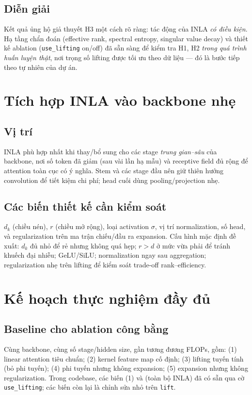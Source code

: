 \documentclass[12pt,a4paper]{article}
\begin{document}
\subsection{Diễn giải}
Kết quả ủng hộ giả thuyết H3 một cách rõ ràng: tác động của INLA \emph{có điều kiện}. Hạ tầng chẩn
đoán (effective rank, spectral entropy, singular value decay) và thiết kế ablation
(\texttt{use\_lifting} on/off) đã sẵn sàng để kiểm tra H1, H2 \emph{trong quá trình huấn luyện thật},
nơi trọng số lifting được tối ưu theo dữ liệu --- đó là bước tiếp theo tự nhiên của dự án.

\section{Tích hợp INLA vào backbone nhẹ}

\subsection{Vị trí}
INLA phù hợp nhất khi thay/bổ sung cho các stage \emph{trung gian--sâu} của backbone, nơi số token
đã giảm (sau vài lần hạ mẫu) và receptive field đủ rộng để attention toàn cục có ý nghĩa. Stem và các
stage đầu nên giữ thiên hướng convolution để tiết kiệm chi phí; head cuối dùng pooling/projection
nhẹ.

\subsection{Các biến thiết kế cần kiểm soát}
$d_k$ (chiều nén), $r$ (chiều mở rộng), loại activation $\sigma$, vị trí normalization, số head, và
regularization trên ma trận chiếu/đầu ra expansion. Cấu hình mặc định đề xuất: $d_k$ đủ nhỏ để rẻ
nhưng không quá hẹp; $r > d$ ở mức vừa phải để tránh khuếch đại nhiễu; GeLU/SiLU; normalization ngay
sau aggregation; regularization nhẹ trên lifting để kiểm soát trade-off rank--efficiency.

\section{Kế hoạch thực nghiệm đầy đủ}

\subsection{Baseline cho ablation công bằng}
Cùng backbone, cùng số stage/hidden size, gần tương đương FLOPs, gồm: (1) linear attention tiêu
chuẩn; (2) kernel feature map cố định; (3) lifting tuyến tính (bỏ phi tuyến); (4) phi tuyến nhưng
không expansion; (5) expansion nhưng không regularization. Trong codebase, các biến (1) và (toàn bộ
INLA) đã có sẵn qua cờ \texttt{use\_lifting}; các biến còn lại là chỉnh sửa nhỏ trên \texttt{lift}.
\end{document}
